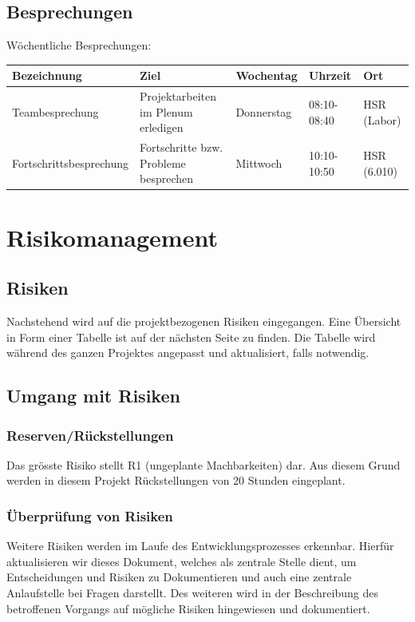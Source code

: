 \subsection*{Besprechungen}
Wöchentliche Besprechungen: \\

\begin{tabularx}{\textwidth}{lXlll}
	\textbf{Bezeichnung}	& \textbf{Ziel} & \textbf{Wochentag} & \textbf{Uhrzeit} & \textbf{Ort}\\
	\hline
	Teambesprechung			& Projektarbeiten im Plenum erledigen	& Donnerstag & 08:10-08:40	& HSR (Labor) \\ \hline
	Fortschrittsbesprechung	& Fortschritte bzw. Probleme besprechen		& Mittwoch & 10:10-10:50	& HSR (6.010) \\ \hline
\end{tabularx}
\pagebreak

\section*{Risikomanagement}
\subsection*{Risiken}
Nachstehend wird auf die projektbezogenen Risiken eingegangen. Eine Übersicht in Form einer Tabelle ist auf der nächsten Seite zu finden. Die Tabelle wird während des ganzen Projektes angepasst und aktualisiert, falls notwendig.

\subsection*{Umgang mit Risiken}
\subsubsection*{Reserven/Rückstellungen}
Das grösste Risiko stellt R1 (ungeplante Machbarkeiten) dar. Aus diesem Grund werden in diesem Projekt Rückstellungen von 20 Stunden eingeplant.

\subsubsection*{Überprüfung von Risiken}
Weitere Risiken werden im Laufe des Entwicklungsprozesses erkennbar. Hierfür aktualisieren wir dieses Dokument, welches als zentrale Stelle dient, um Entscheidungen und Risiken zu Dokumentieren und auch eine zentrale Anlaufstelle bei Fragen darstellt. Des weiteren wird in der Beschreibung des betroffenen Vorgangs auf mögliche Risiken hingewiesen und dokumentiert.
\pagebreak
	
